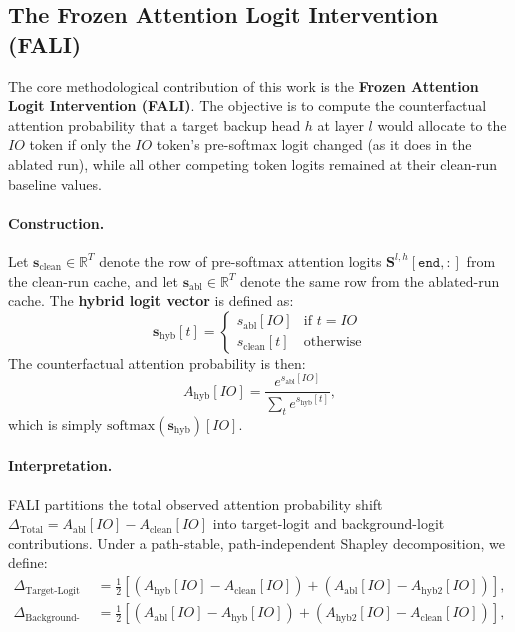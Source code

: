 \documentclass[10pt]{article} %
\begin{document}
\subsection{The Frozen Attention Logit Intervention (FALI)}
\label{subsec:fali}

The core methodological contribution of this work is the \textbf{Frozen Attention
Logit Intervention (FALI)}. The objective is to compute the counterfactual
attention probability that a target backup head $h$ at layer $l$ would allocate
to the $IO$ token if only the $IO$ token's pre-softmax logit changed (as it does
in the ablated run), while all other competing token logits remained at their
clean-run baseline values.

\paragraph{Construction.} Let $\mathbf{s}_\text{clean} \in \mathbb{R}^T$
denote the row of pre-softmax attention logits
$\mathbf{S}^{l,h}[\texttt{end}, :]$ from the clean-run cache, and let
$\mathbf{s}_\text{abl} \in \mathbb{R}^T$ denote the same row from the
ablated-run cache. The \textbf{hybrid logit vector} is defined as:
\begin{equation}
  \mathbf{s}_\text{hyb}[t] =
  \begin{cases}
    s_\text{abl}[IO] & \text{if } t = IO \\
    s_\text{clean}[t] & \text{otherwise}
  \end{cases}
  \label{eq:hybrid}
\end{equation}
The counterfactual attention probability is then:
\begin{equation}
  A_\text{hyb}[IO] = \frac{e^{s_\text{abl}[IO]}}{\sum_{t} e^{s_\text{hyb}[t]}},
  \label{eq:hybridattn}
\end{equation}
which is simply $\text{softmax}(\mathbf{s}_\text{hyb})[IO]$.\paragraph{Interpretation.} FALI partitions the total observed attention probability shift
$\Delta_\text{Total} = A_\text{abl}[IO] - A_\text{clean}[IO]$ into target-logit and background-logit contributions. Under a path-stable, path-independent Shapley decomposition, we define:
\begin{align}
  \Delta_\text{Target-Logit} &= \frac{1}{2} \left[ \left( A_\text{hyb}[IO] - A_\text{clean}[IO] \right) + \left( A_\text{abl}[IO] - A_\text{hyb2}[IO] \right) \right], \label{eq:target_logit_contrib} \\
  \Delta_\text{Background-Logit} &= \frac{1}{2} \left[ \left( A_\text{abl}[IO] - A_\text{hyb}[IO] \right) + \left( A_\text{hyb2}[IO] - A_\text{clean}[IO] \right) \right],
  \label{eq:background_logit_contrib}
\end{align}
\end{document}
